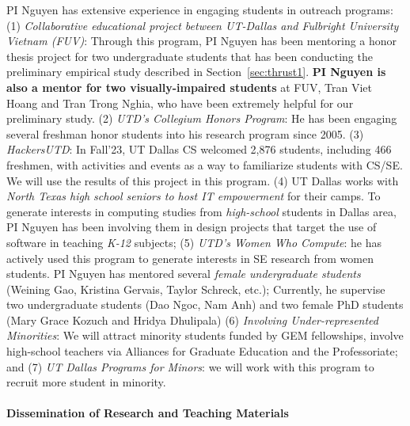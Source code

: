 PI Nguyen has extensive experience in engaging students in outreach
programs: (1) {\em Collaborative educational project between UT-Dallas
and Fulbright University Vietnam (FUV)}: Through this program, PI
Nguyen has been mentoring a honor thesis project for two undergraduate
students that has been conducting the preliminary empirical study
described in Section~\ref{sec:thrust1}. {\bf PI Nguyen is also a mentor for
two visually-impaired students} at FUV, Tran Viet Hoang and Tran Trong
Nghia, who have been extremely helpful for our preliminary study.
(2) {\em UTD's Collegium Honors Program}: He
has been engaging several freshman honor students into his research
program since 2005. (3) {\em HackersUTD}: In Fall'23, UT Dallas CS
welcomed 2,876 students, including 466 freshmen, with activities and
events as a way to familiarize students with CS/SE. We will use the
results of this project in this program.
%
(4) UT Dallas works with {\em North Texas high school seniors to host
IT empowerment} for their camps. To generate interests in computing
studies from {\em high-school} students in Dallas area, PI Nguyen has
been involving them in design projects that target the use of software
in teaching {\em K-12} subjects; (5) {\em UTD's Women Who Compute}: he
has actively used this program to generate interests in SE research
from women students. PI Nguyen has mentored several {\em female
undergraduate students} (Weining Gao, Kristina Gervais, Taylor
Schreck, etc.); Currently, he supervise two undergraduate students
(Dao Ngoc, Nam Anh) and two female PhD students (Mary Grace Kozuch and
Hridya Dhulipala) (6) {\em Involving Under-represented Minorities}: We
will attract minority students funded by GEM fellowships, involve
high-school teachers via Alliances for Graduate Education and the
Professoriate; and (7) {\em UT Dallas Programs for Minors}: we will
work with this program to recruit more student in minority.


\paragraph{Dissemination of Research and Teaching Materials}

